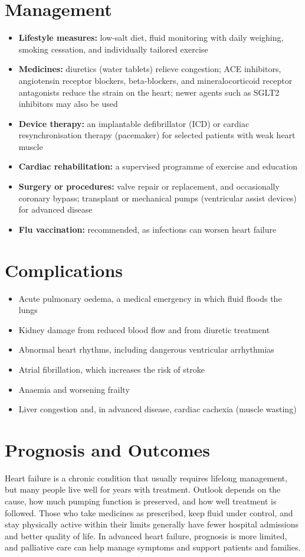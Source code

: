 \section*{Management}
\begin{itemize}
    \item \textbf{Lifestyle measures:} low-salt diet, fluid monitoring with daily weighing, smoking cessation, and individually tailored exercise
    \item \textbf{Medicines:} diuretics (water tablets) relieve congestion; ACE inhibitors, angiotensin receptor blockers, beta-blockers, and mineralocorticoid receptor antagonists reduce the strain on the heart; newer agents such as SGLT2 inhibitors may also be used
    \item \textbf{Device therapy:} an implantable defibrillator (ICD) or cardiac resynchronisation therapy (pacemaker) for selected patients with weak heart muscle
    \item \textbf{Cardiac rehabilitation:} a supervised programme of exercise and education
    \item \textbf{Surgery or procedures:} valve repair or replacement, and occasionally coronary bypass; transplant or mechanical pumps (ventricular assist devices) for advanced disease
    \item \textbf{Flu vaccination:} recommended, as infections can worsen heart failure
\end{itemize}

\section*{Complications}
\begin{itemize}
    \item Acute pulmonary oedema, a medical emergency in which fluid floods the lungs
    \item Kidney damage from reduced blood flow and from diuretic treatment
    \item Abnormal heart rhythms, including dangerous ventricular arrhythmias
    \item Atrial fibrillation, which increases the risk of stroke
    \item Anaemia and worsening frailty
    \item Liver congestion and, in advanced disease, cardiac cachexia (muscle wasting)
\end{itemize}

\section*{Prognosis and Outcomes}
Heart failure is a chronic condition that usually requires lifelong management, but many people live well for years with treatment. Outlook depends on the cause, how much pumping function is preserved, and how well treatment is followed. Those who take medicines as prescribed, keep fluid under control, and stay physically active within their limits generally have fewer hospital admissions and better quality of life. In advanced heart failure, prognosis is more limited, and palliative care can help manage symptoms and support patients and families.

